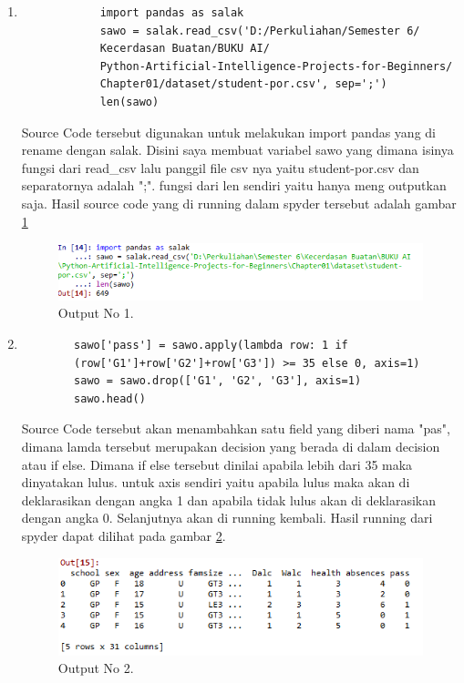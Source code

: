\begin{enumerate}

		\item
		\begin{verbatim}
			import pandas as salak
			sawo = salak.read_csv('D:/Perkuliahan/Semester 6/
			Kecerdasan Buatan/BUKU AI/
			Python-Artificial-Intelligence-Projects-for-Beginners/
			Chapter01/dataset/student-por.csv', sep=';')
			len(sawo)
		\end{verbatim}

	\subitem Source Code tersebut digunakan untuk melakukan import pandas yang di rename dengan salak. Disini saya membuat 			variabel sawo yang dimana isinya fungsi dari read\_csv lalu panggil file csv nya yaitu student-por.csv dan separatornya adalah 		";". fungsi dari len sendiri yaitu hanya meng outputkan saja. Hasil source code yang di running dalam spyder tersebut adalah 			gambar \ref{YNO1}

	\begin{figure}[ht]
		\centerline{\includegraphics[width=1\textwidth]{figures/YN/YNBerhasil1.png}}
		\caption{Output No 1.}
		\label{YNO1}
	\end{figure}

		\item
	\begin{verbatim}
		sawo['pass'] = sawo.apply(lambda row: 1 if 
		(row['G1']+row['G2']+row['G3']) >= 35 else 0, axis=1)
		sawo = sawo.drop(['G1', 'G2', 'G3'], axis=1)
		sawo.head()
	\end{verbatim}
	\subitem Source Code tersebut akan menambahkan satu field yang diberi nama "pas", dimana lamda tersebut merupakan decision 			    yang berada di dalam decision atau if else. Dimana if else tersebut dinilai apabila lebih dari 35 maka dinyatakan lulus. 				    untuk axis sendiri yaitu apabila lulus maka akan di deklarasikan dengan angka 1 dan apabila tidak lulus akan di 					    deklarasikan dengan angka 0. Selanjutnya akan di running kembali. Hasil running dari spyder dapat dilihat pada gambar 			    \ref{YNO2}.

	\begin{figure}[ht]
		\centerline{\includegraphics[width=1\textwidth]{figures/YN/YNBerhasil2.png}}
		\caption{Output No 2.}
		\label{YNO2}
	\end{figure}


\end{enumerate}
